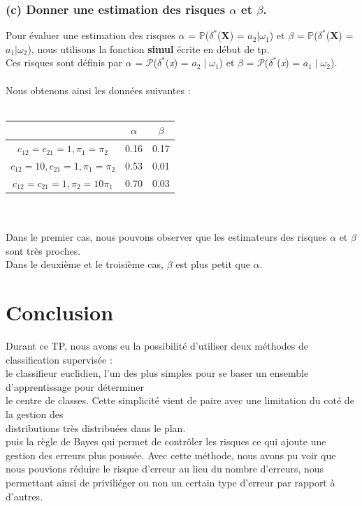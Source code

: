 \documentclass[a4paper, 10pt]{article}
\begin{document}
\subsubsection*{(c) Donner une estimation des risques $\alpha$ et $\beta$.}
Pour évaluer une estimation des risques $\alpha$ = $\mathbb{P}$($\delta^{*}$(\textbf{X}) = \textit{$a_{2}$}$\mid\omega_{1}$) et
$\beta$ = $\mathbb{P}$($\delta^{*}$(\textbf{X}) = \textit{$a_{1}$}$\mid\omega_{2}$), nous utilisons la fonction \textbf{simul} écrite
en début de tp.\\
Ces risques sont définis par $\alpha$ = $\mathcal{P}$($\delta^{*}$(\textit{x}) = $a_{2}\mid\omega_{1}$) et
$\beta$ = $\mathcal{P}$($\delta^{*}$(\textit{x}) = $a_{1}\mid\omega_{2}$).\\ \\
Nous obtenons ainsi les données suivantes :\\ \\
\begin{tabular}{|c|c|c|}
\hline
& $\alpha$ & $\beta$ \\
\hline
$c_{12} = c_{21} = 1, \pi_{1} = \pi_{2}$ & 0.16 & 0.17 \\
\hline
$c_{12} = 10, c_{21} = 1, \pi_{1} = \pi_{2}$ & 0.53 & 0.01 \\
\hline
$c_{12} = c_{21} = 1, \pi_{2} = 10 \pi_{1}$ & 0.70 & 0.03 \\
\hline
\end{tabular}\\ \\


Dans le premier cas, nous pouvons observer que les estimateurs des risques $\alpha$ et $\beta$ sont très proches.\\
Dans le deuxième et le troisième cas, $\beta$ est plus petit que $\alpha$.


\section*{Conclusion}
Durant ce TP, nous avons eu la possibilité d'utiliser deux méthodes de classification supervisée :\\
le classifieur euclidien, l'un des plus simples pour se baser un ensemble d'apprentissage pour déterminer\\le centre de classes.
Cette simplicité vient de paire avec une limitation du coté de la gestion des\\distributions très distribuées dans le plan.\\
puis la règle de Bayes qui permet de contrôler les risques ce qui ajoute une gestion des erreurs plus poussée.
Avec cette méthode, nous avons pu voir que nous pouvions réduire le risque d'erreur au lieu du nombre d'erreurs,
nous permettant ainsi de priviliéger ou non un certain type d'erreur par rapport à d'autres.
\end{document}
